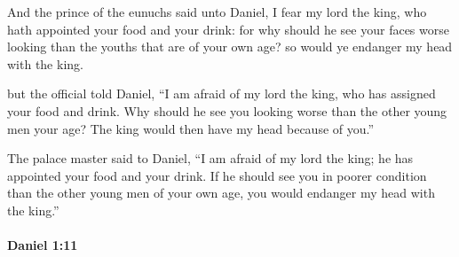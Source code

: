 			\begin{versebox}
					\item[BHS] 
					\item[LXX] 
					\item[ASV] And the prince of the eunuchs said unto Daniel, I fear my lord the king, who hath appointed your food and your drink: for why should he see your faces worse looking than the youths that are of your own age? so would ye endanger my head with the king.
					\item[NIV] but the official told Daniel, “I am afraid of my lord the king, who has assigned your food and drink. Why should he see you looking worse than the other young men your age? The king would then have my head because of you.”
					\item[NRSV] The palace master said to Daniel, “I am afraid of my lord the king; he has appointed your food and your drink. If he should see you in poorer condition than the other young men of your own age, you would endanger my head with the king.”
			\end{versebox}

		\paragraph{Daniel 1:11} %
			\label{DANIEL-1-11}

